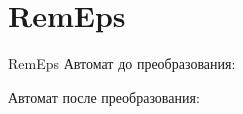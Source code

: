 \section{RemEps}
\begin{frame}{RemEps}
	Автомат до преобразования:


	Автомат после преобразования:


\end{frame}
